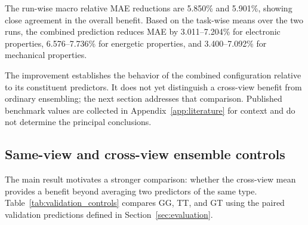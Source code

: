 \documentclass[a4paper,fleqn]{cas-sc}
\begin{document}
The run-wise macro relative MAE reductions are 5.850\% and 5.901\%, showing close agreement in the overall benefit. Based on the task-wise means over the two runs, the combined prediction reduces MAE by 3.011--7.204\% for electronic properties, 6.576--7.736\% for energetic properties, and 3.400--7.092\% for mechanical properties.

The improvement establishes the behavior of the combined configuration relative to its constituent predictors. It does not yet distinguish a cross-view benefit from ordinary ensembling; the next section addresses that comparison. Published benchmark values are collected in Appendix~\ref{app:literature} for context and do not determine the principal conclusions.

\subsection{Same-view and cross-view ensemble controls}\label{sec:controls}
The main result motivates a stronger comparison: whether the cross-view mean provides a benefit beyond averaging two predictors of the same type. Table~\ref{tab:validation_controls} compares GG, TT, and GT using the paired validation predictions defined in Section~\ref{sec:evaluation}.
\end{document}
